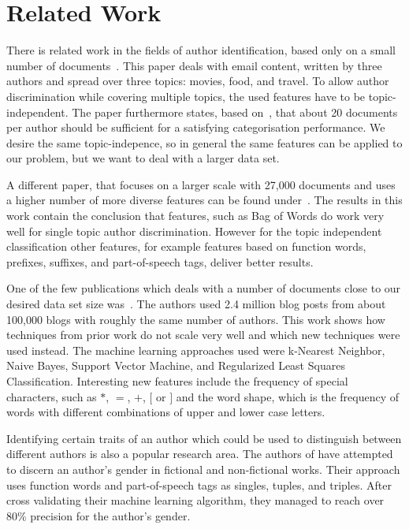 
\section{Related Work}
\label{sec:related}
There is related work in the fields of author identification, based only on a small number of documents~\cite{de2001mining}.
This paper deals with email content, written by three authors and spread over three topics: movies, food, and travel.
To allow author discrimination while covering multiple topics, the used features have to be topic-independent.
The paper furthermore states, based on~\cite{corney2001identifying}, that about 20 documents per author should be sufficient for a satisfying categorisation performance.
We desire the same topic-indepence, so in general the same features can be applied to our problem, but we want to deal with a larger data set.


A different paper, that focuses on a larger scale with 27,000 documents and uses a higher number of more diverse features can be found under~\cite{madigan2005author}.
The results in this work contain the conclusion that features, such as Bag of Words do work very well for single topic author discrimination.
However for the topic independent classification other features, for example features based on function words, prefixes, suffixes, and part-of-speech tags, deliver better results.


One of the few publications which deals with a number of documents close to our desired data set size was~\cite{narayanan2012feasibility}.
The authors used 2.4 million blog posts from about 100,000 blogs with roughly the same number of authors.
This work shows how techniques from prior work do not scale very well and which new techniques were used instead.
The machine learning approaches used were k-Nearest Neighbor, Naive Bayes, Support Vector Machine, and Regularized Least Squares Classification.
Interesting new features include the frequency of special characters, such as $*$, $=$, $+$, $[$ or $]$ and the word shape, which is the frequency of words with different combinations of upper and lower case letters.


Identifying certain traits of an author which could be used to distinguish between different authors is also a popular research area.
The authors of \cite{koppel2003automatically} have attempted to discern an author's gender in fictional and non-fictional works.
Their approach uses function words and part-of-speech tags as singles, tuples, and triples.
After cross validating their machine learning algorithm, they managed to reach over 80\% precision for the author's gender.